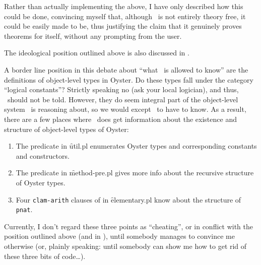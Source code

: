 Rather than actually implementing the above, I have only described
how this could be done, convincing myself that, although \clam\ is not
entirely theory free, it could be easily made to be, thus
justifying the claim that it genuinely proves theorems for itself,
without any prompting from the user. 

The ideological position outlined above is also discussed in
\cite{bb539}.

A border line position in this debate about ``what \clam\ is allowed
to know'' are the definitions of object-level types in Oyster. Do
these types fall under the category ``logical constants''? Strictly
speaking no (ask your local logician), and thus, \clam\ should not be told.
However, they do seem integral part of the object-level system \clam\ 
is reasoning about, so we would except \clam\ to have to know. As a
result, there are a few places where \clam\ does get information about
the existence and structure of object-level types of Oyster:
\begin{enumerate}
\item 
The predicate  in \f{util.pl} enumerates Oyster
types and corresponding constants and constructors.
\item 
The predicate  in \f{method-pre.pl} gives more info
about the recursive structure of Oyster types.
\item
Four {\tt clam-arith} clauses of  in \f{elementary.pl} know
about the structure of {\tt pnat}.
\end{enumerate}

Currently, I don't regard these three points as ``cheating'', or in
conflict with the position outlined above (and in \cite{bb539}), until 
somebody manages to convince me otherwise (or, plainly speaking:
until somebody can show me how to get rid of these three bits of
code\ldots). 



